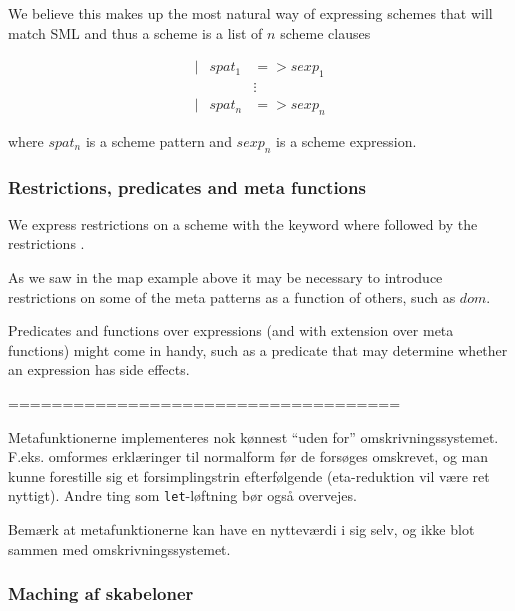 We believe this makes up the most natural way of expressing schemes that will
match SML and thus a scheme is a list of $n$ scheme clauses

\begin{eqnarray*}[rqrl]
| & spat_1 & => sexp_1 \\
  &  & \vdots \\
| & spat_n & => sexp_n
\end{eqnarray*}

where $spat_n$ is a scheme pattern and $sexp_n$ is a scheme expression.


\subsubsection{Restrictions, predicates and meta functions}


We express restrictions on a scheme with the keyword \textsf{where} followed by
the restrictions . 

As we saw in the \textsf{map} example above it may be necessary to introduce
restrictions on some of the meta patterns as a function of others, such as
$dom$.

Predicates and functions over expressions (and with extension over meta
functions)  might come in handy, such as a
predicate that may determine whether an expression has side effects.

====================================

Metafunktionerne implementeres nok kønnest ``uden for''
omskrivningssystemet. F.eks. omformes erklæringer til normalform før de
forsøges omskrevet, og man kunne forestille sig et forsimplingstrin
efterfølgende (eta-reduktion vil være ret nyttigt). Andre ting som
\texttt{let}-løftning bør også overvejes.

Bemærk at metafunktionerne kan have en nytteværdi i sig selv, og ikke blot
sammen med omskrivningssystemet.

\subsubsection{Maching af skabeloner}

